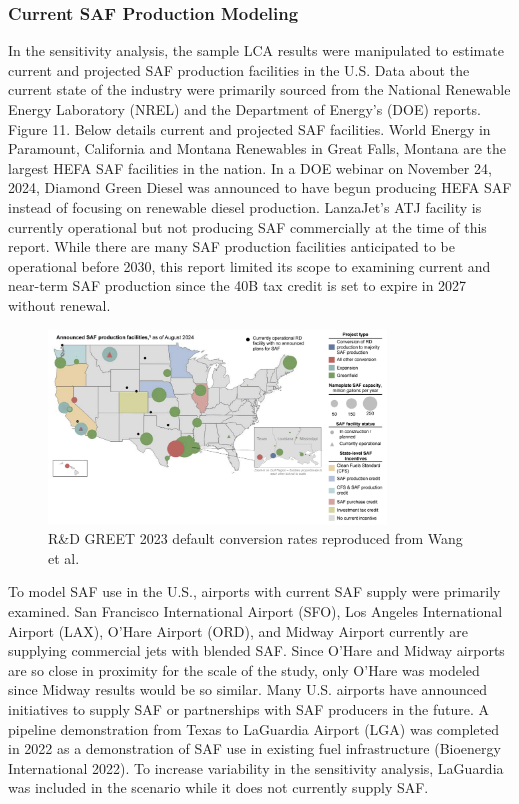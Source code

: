 \documentclass[12pt]{article}
\begin{document}
\subsubsection{ Current SAF Production Modeling}

In the sensitivity analysis, the sample LCA results were manipulated to estimate current and projected SAF production facilities in the U.S. Data about the current state of the industry were primarily sourced from the National Renewable Energy Laboratory (NREL)  and the Department of Energy’s (DOE) reports. Figure 11. Below details current and projected SAF facilities. World Energy in Paramount, California and Montana Renewables in Great Falls, Montana are the largest HEFA SAF facilities in the nation. In a DOE webinar on November 24, 2024, Diamond Green Diesel was announced to have begun producing HEFA SAF instead of focusing on renewable diesel production. LanzaJet’s ATJ facility is currently operational but not producing SAF commercially at the time of this report. While there are many SAF production facilities anticipated to be operational before 2030, this report limited its scope to examining current and near-term SAF production since the 40B tax credit is set to expire in 2027 without renewal. 

\begin{figure}[H]
\centering
\includegraphics[width=0.8\textwidth]{Figures/Fig 12.png} %
\caption{R\&D GREET 2023 default conversion rates  reproduced from Wang et al.}
\label{fig:fig12}
\end{figure}

To model SAF use in the U.S., airports with current SAF supply were primarily examined. San Francisco International Airport (SFO), Los Angeles International Airport (LAX), O’Hare Airport (ORD), and Midway Airport currently are supplying commercial jets with blended SAF. Since O’Hare  and Midway airports are so close in proximity for the scale of the study, only O’Hare was modeled since Midway results would be so similar. Many U.S. airports have announced initiatives to supply SAF or partnerships with SAF producers in the future. A pipeline demonstration from Texas to LaGuardia Airport (LGA) was completed in 2022 as a demonstration of SAF use in existing fuel infrastructure (Bioenergy International 2022). To increase variability in the sensitivity analysis, LaGuardia was included in the scenario while it does not currently supply SAF. 
\end{document}
